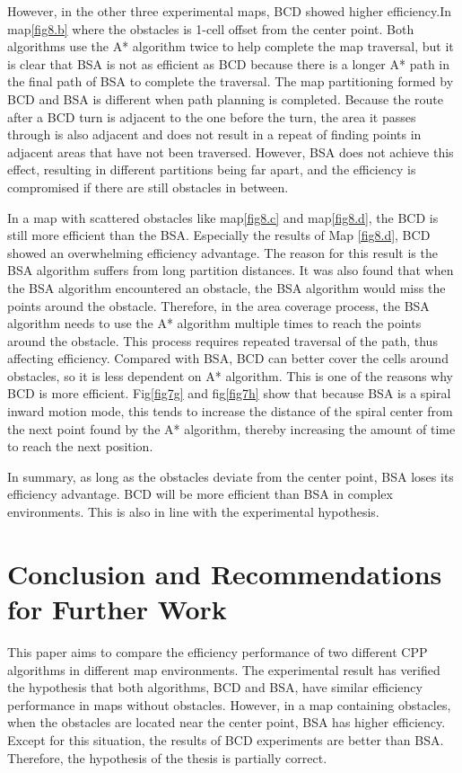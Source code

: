 \documentclass[conference]{IEEEtran}
\begin{document}
However, in the other three experimental maps, BCD showed higher efficiency.In map\ref{fig8.b} where the  obstacles is 1-cell offset from the center point. Both algorithms use the A* algorithm twice to help complete the map traversal, but it is clear that BSA is not as efficient as BCD because there is a longer A* path in the final path of BSA to complete the traversal. The map partitioning formed by BCD and BSA is different when path planning is completed. Because the route after a BCD turn is adjacent to the one before the turn, the area it passes through is also adjacent and does not result in a repeat of finding points in adjacent areas that have not been traversed. However, BSA does not achieve this effect, resulting in different partitions being far apart, and the efficiency is compromised if there are still obstacles in between.

In a map with scattered obstacles like map\ref{fig8.c} and map\ref{fig8.d}, the BCD is still more efficient than the BSA. Especially the results of Map \ref{fig8.d}, BCD showed an overwhelming efficiency advantage. The reason for this result is the BSA algorithm suffers from long partition distances. It was also found that when the BSA algorithm encountered an obstacle, the BSA algorithm would miss the points around the obstacle. Therefore, in the area coverage process, the BSA algorithm needs to use the A* algorithm multiple times to reach the points around the obstacle. This process requires repeated traversal of the path, thus affecting efficiency. Compared with BSA, BCD can better cover the cells around obstacles, so it is less dependent on A* algorithm. This is one of the reasons why BCD is more efficient. Fig\ref{fig7g} and fig\ref{fig7h} show that because BSA is a spiral inward motion mode, this tends to increase the distance of the spiral center from the next point found by the A* algorithm, thereby increasing the amount of time to reach the next position. 

In summary, as long as the obstacles deviate from the center point, BSA loses its efficiency advantage. BCD will be more efficient than BSA in complex environments. This is also in line with the experimental hypothesis. 


\section{Conclusion and Recommendations for Further Work}

This paper aims to compare the efficiency performance of two different CPP algorithms in different map environments. The experimental result has verified the hypothesis that both algorithms, BCD and BSA, have similar efficiency performance in maps without obstacles. However, in a map containing obstacles, when the obstacles are located near the center point, BSA has higher efficiency. Except for this situation, the results of BCD experiments are better than BSA. Therefore, the hypothesis of the thesis is partially correct.
\end{document}
